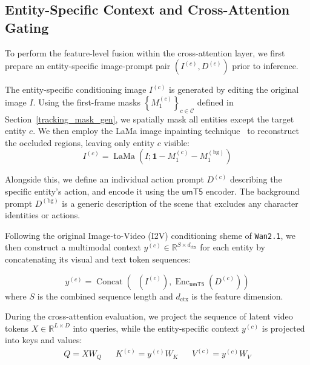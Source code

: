 \documentclass{article}
\newcommand{\Tfive}{\ensuremath{\mathsf{umT5}}}
\newcommand{\CLIP}{\ensuremath{\mathsf{CLIP}}\xspace}
\DeclareMathOperator{\Enc}{Enc}
\DeclareMathOperator{\CLIPimg}{\CLIP_{img}}
\begin{document}
\subsection{Entity-Specific Context and Cross-Attention Gating}\label{cross_attention_gating}

To perform the feature-level fusion within the cross-attention layer, we first prepare an entity-specific image-prompt pair $\left(I^{(c)}, D^{(c)}\right)$ prior to inference.

The entity-specific conditioning image $I^{(c)}$ is generated by editing the original image $I$. Using the first-frame masks $\left\{M_1^{(c)}\right\}_{c\in\mathcal{C}}$ defined in Section~\ref{tracking_mask_gen}, we spatially mask all entities except the target entity $c$.
We then employ the LaMa image inpainting technique~\cite{suvorovResolutionrobustLargeMask2021} to reconstruct the occluded regions, leaving only entity $c$ visible:
\begin{equation}
  I^{(c)} = \operatorname{LaMa}\left(I; \mathbf{1} - M_1^{(c)} - M_1^{(\text{bg})} \right)
\end{equation}


Alongside this, we define an individual action prompt $D^{(c)}$ describing the specific entity's action, and encode it using the \Tfive{} encoder.
The background prompt $D^{(\text{bg})}$ is a generic description of the scene that excludes any character identities or actions.

Following the original Image-to-Video (I2V) conditioning sheme of \texttt{Wan2.1}, we then construct a multimodal context $y^{(c)} \in \mathbb{R}^{S \times d_{\text{ctx}}}$ for each entity by concatenating its visual and text token sequences:

\begin{equation}
y^{(c)} = \operatorname{Concat}\left( \CLIPimg(I^{(c)}), \Enc_{\Tfive}(D^{(c)}) \right)
\end{equation}
where $S$ is the combined sequence length and $d_{\text{ctx}}$ is the feature dimension.


During the cross-attention evaluation, we project the sequence of latent video tokens $X \in \mathbb{R}^{L\times D}$ into queries, while the entity-specific context $y^{(c)}$ is projected into keys and values:
\begin{align}
Q = X W_Q && K^{(c)} = y^{(c)} W_K && V^{(c)} = y^{(c)} W_V
\end{align}
\end{document}
